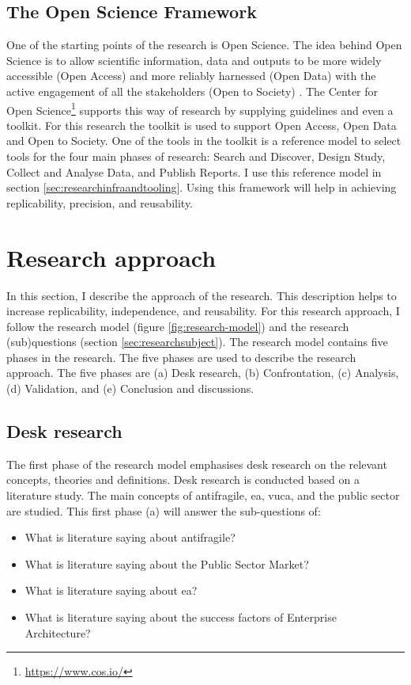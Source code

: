\subsection{The Open Science Framework}
\label{sub:osf}
One of the starting points of the research is Open Science. The idea behind Open Science is to allow scientific information, data and outputs to be more widely accessible (Open Access) and more reliably harnessed (Open Data) with the active engagement of all the stakeholders (Open to Society) \parencite{UNESCO2020}. The Center for Open Science\footnote{{\url{https://www.cos.io/}}} supports this way of research by supplying guidelines and even a toolkit. For this research the toolkit is used to support Open Access, Open Data and Open to Society. One of the tools in the toolkit is a reference model to select tools for the four main phases of research: Search and Discover, Design Study, Collect and Analyse Data, and Publish Reports. I use this reference model in section \ref{sec:researchinfraandtooling}. Using this framework will help in achieving replicability, precision, and reusability.
\section{Research approach}
\label{sec:researchapproach}
In this section, I describe the approach of the research. This description helps to increase replicability, independence, and reusability. For this research approach, I follow the research model (figure \ref{fig:research-model}) and the research (sub)questions (section \ref{sec:researchsubject}). The research model contains five phases in the research. The five phases are used to describe the research approach. The five phases are (a) Desk research, (b) Confrontation, (c) Analysis, (d) Validation, and (e) Conclusion and discussions.

\subsection{Desk research}
\label{sub:deskresearchphase}
The first phase of the research model emphasises desk research on the relevant concepts, theories and definitions. Desk research is conducted based on a literature study. The main concepts of \gls{antifragile}, \acrshort{ea}, \acrshort{vuca}, and the public sector are studied. This first phase (a) will answer the sub-questions of:
\begin{itemize}
	\item{What is literature saying about \gls{antifragile}?}
	\item{What is literature saying about the Public Sector Market?}
	\item{What is literature saying about \acrlong{ea}?}
	\item{What is literature saying about the success factors of Enterprise Architecture?}
\end{itemize}


